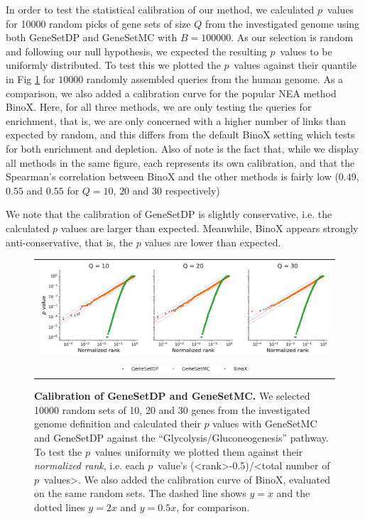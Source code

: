 \documentclass[10pt,letterpaper]{article}
\begin{document}
In order to test the statistical calibration of our method, we calculated $p$~values for 10000 random picks of gene sets of size $Q$ from the investigated genome using both GeneSetDP and GeneSetMC with $B = 100000$. As our selection is random and following our null hypothesis, we expected the resulting $p$~values to be uniformly distributed. To test this we plotted the $p$~values against their quantile in Fig \ref{fig:calibration} for $10000$ randomly assembled queries from the human genome. As a comparison, we also added a calibration curve for the popular NEA method BinoX\cite{ogris2016novel}. Here, for all three methods, we are only testing the queries for enrichment, that is, we are only concerned with a higher number of links than expected by random, and this differs from the default BinoX setting which tests for both enrichment and depletion. 
Also of note is the fact that, while we display all methods in the same figure, each represents its own calibration, and that the Spearman's correlation between BinoX and the other methods is fairly low ($0.49$, $0.55$ and $0.55$ for $Q=10$, $20$ and $30$ respectively)

We note that the calibration of GeneSetDP is slightly conservative, i.e. the calculated $p$ values are larger than expected. Meanwhile, BinoX appears strongly anti-conservative, that is, the $p$ values are lower than expected.

\begin{figure}[htb]
  \begin{center}
		  \begin{tabular}[t]{c}
				\includegraphics[width=.9\textwidth]{figures/calibration_multiple.png} \\
				\includegraphics[width=0.45\textwidth]{figures/calibration_legend.png}
		\end{tabular}
  \end{center}
  \caption{{\bf Calibration of GeneSetDP and GeneSetMC.} We selected 10000 random sets of 10, 20 and 30 genes from the investigated genome definition and calculated their $p$ values with GeneSetMC and GeneSetDP against the ``Glycolysis/Gluconeogenesis'' pathway. To test the $p$~values uniformity we plotted them against their {\em normalized rank}, i.e. each $p$~value's (<rank>-0.5)/<total number of $p$~values>. We also added the calibration curve of BinoX, evaluated on the same random sets. The dashed line shows $y = x$ and the dotted lines $y = 2x$ and $y = 0.5x$, for comparison.}
  \label{fig:calibration}
\end{figure}
\end{document}
